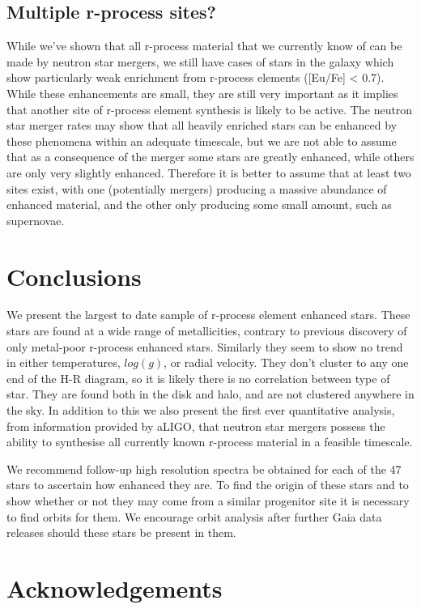 \documentclass[a4paper,fleqn,usenatbib]{mnras}
\begin{document}
	\subsection{Multiple r-process sites?}
	While we've shown that all r-process material that we currently know of can be made by neutron star mergers, we still have cases of stars in the galaxy which show particularly weak enrichment from r-process elements ([Eu/Fe] < 0.7). While these enhancements are small, they are still very important as it implies that another site of r-process element synthesis is likely to be active. The neutron star merger rates may show that all heavily enriched stars can be enhanced by these phenomena within an adequate timescale, but we are not able to assume that as a consequence of the merger some stars are greatly enhanced, while others are only very slightly enhanced. Therefore it is better to assume that at least two sites exist, with one (potentially mergers) producing a massive abundance of enhanced material, and the other only producing some small amount, such as supernovae.
	
	\section{Conclusions}
	We present the largest to date sample of r-process element enhanced stars. These stars are found at a wide range of metallicities, contrary to previous discovery of only metal-poor r-process enhanced stars. Similarly they seem to show no trend in either temperatures, $log(g)$, or radial velocity. They don't cluster to any one end of the H-R diagram, so it is likely there is no correlation between type of star. They are found both in the disk and halo, and are not clustered anywhere in the sky. In addition to this we also present the first ever quantitative analysis, from information provided by aLIGO, that neutron star mergers possess the ability to synthesise all currently known r-process material in a feasible timescale. 
	
	We recommend follow-up high resolution spectra be obtained for each of the 47 stars to ascertain how enhanced they are. To find the origin of these stars and to show whether or not they may come from a similar progenitor site it is necessary to find orbits for them. We encourage orbit analysis after further Gaia data releases should these stars be present in them.
	
	\section*{Acknowledgements}
	
\end{document}
